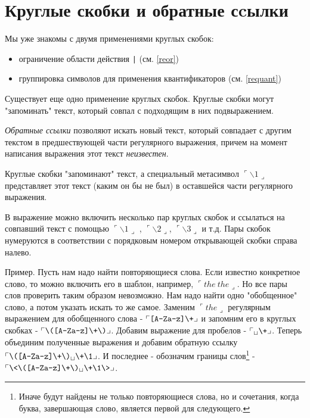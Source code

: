 \section{Круглые скобки и обратные сcылки}

Мы уже знакомы с двумя применениями круглых скобок:
\begin{itemize}
\item ограничение области действия \verb+|+ (см. \ref{reor})
\item группировка символов для применения квантификаторов (см. \ref{requant})
\end{itemize}

Существует еще одно применение круглых скобок. Круглые скобки могут "запоминать" текст, который совпал с подходящим в них подвыражением.

\emph{Обратные ссылки} позволяют искать новый текст, который совпадает с другим текстом в предшествующей части регулярного выражения, причем на момент написания выражения этот текст \emph{неизвестен}.

Круглые скобки "запоминают" текст, а специальный метасимвол $\ulcorner \backslash 1 \lrcorner$ представляет этот текст (каким он бы не был) в оставшейся части регулярного выражения.

В выражение можно включить несколько пар круглых скобок и ссылаться на совпавший текст с помощью $\ulcorner \backslash 1 \lrcorner$ , $\ulcorner \backslash 2 \lrcorner$, $\ulcorner \backslash 3 \lrcorner$ и т.д. Пары скобок нумеруются в соответствии с порядковым номером открывающей скобки справа налево.

Пример. Пусть нам надо найти повторяющиеся слова. Если известно конкретное слово, то можно включить его в шаблон, например, $\ulcorner the\ the \lrcorner$. Но все пары слов проверить таким образом невозможно. Нам надо найти одно "обобщенное" слово, а потом указать искать то же самое. Заменим $\ulcorner the \lrcorner$ регулярным выражением для обобщенного слова - $\ulcorner \verb=[A-Za-z]\+= \lrcorner$ и запомним его в круглых скобках -  $\ulcorner \verb=\([A-Za-z]\+\)= \lrcorner$. Добавим выражение для пробелов - $\ulcorner _\sqcup \verb=\+= \lrcorner$. Теперь объединим полученные выражения и добавим обратную ссылку  $\ulcorner \verb=\([A-Za-z]\+\)= _\sqcup \verb=\+\1= \lrcorner$. И последнее - обозначим границы слов\footnote{Иначе будут найдены не только повторяющиеся слова, но и сочетания, когда буква, завершающая слово, является первой для следующего.} -  $\ulcorner \verb=\<\([A-Za-z]\+\)= _\sqcup \verb=\+\1\>= \lrcorner$.

